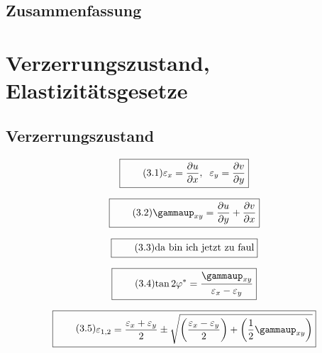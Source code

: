 \documentclass[11pt]{article}
\newcommand{\1}{ {\mathds{1}} }
\renewcommand{\epsilon}{\varepsilon}
\renewcommand{\gamma  }{\gammaup   }
\begin{document}
		\subsection{Zusammenfassung}
		
		\section{Verzerrungszustand, Elastizitätsgesetze}
		\subsection{Verzerrungszustand}

		\begin{equation}
			\boxed{
				\tag{3.1}
				\begin{split}
					\varepsilon_x
					=
					\frac{\partial u}{\partial x}, \;\;
					\varepsilon_y
					=
					\frac{\partial v}{\partial y}				 
				\end{split}
			}
		\end{equation}		

		\begin{equation}
			\boxed{
				\tag{3.2}
				\begin{split}
					\gamma_{xy}
					=
					\frac{\partial u}{\partial y}
					+
					\frac{\partial v}{\partial x}
				\end{split}
			}
		\end{equation}		

		\begin{equation}
			\boxed{
				\tag{3.3}
				\begin{split}
					\text{da bin ich jetzt zu faul}
				\end{split}
			}
		\end{equation}		

		\begin{equation}
			\boxed{
				\tag{3.4}
				\begin{split}
					\tan 2\varphi^\ast
					=
					\frac{\gamma_{xy}}{\varepsilon_x -\varepsilon_y}
				\end{split}
			}
		\end{equation}

		\begin{equation}
			\boxed{
				\tag{3.5}
				\begin{split}
					\epsilon_{1,2} = \frac{\epsilon_x + \epsilon_y}{2}
					\pm
					\sqrt{\left( \frac{\epsilon_x - \epsilon_y}{2}\right) + \left( \frac{1}{2} \gamma_{xy} \right) }
				\end{split}
			}
		\end{equation}		
\end{document}
